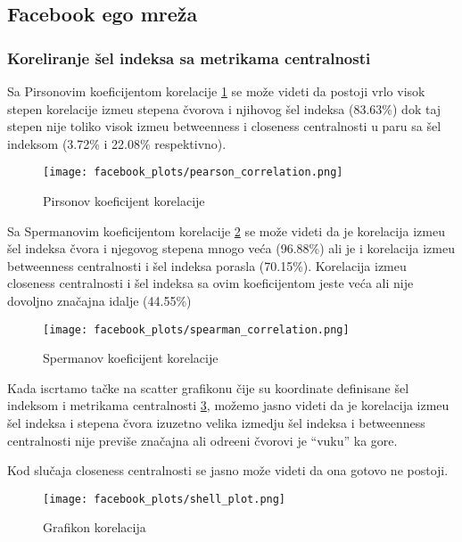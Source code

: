 \documentclass[11pt,a4paper]{article}
\begin{document}
\subsection{Facebook ego mre\v za}

\subsubsection{Koreliranje \v sel indeksa sa metrikama centralnosti}

Sa Pirsonovim koeficijentom korelacije \ref{fig:facebook-prison} se mo\v ze videti da postoji vrlo visok stepen korelacije izme\dj u stepena \v cvorova i njihovog \v sel indeksa (83.63\%) dok taj stepen nije toliko visok izme\dj u betweenness i closeness centralnosti u paru sa \v sel indeksom (3.72\% i 22.08\% respektivno).

\begin{figure}
    \centering
    \texttt{[image: facebook\_plots/pearson\_correlation.png]}
    \caption{Pirsonov koeficijent korelacije}
    \label{fig:facebook-prison}
\end{figure}

Sa Spermanovim koeficijentom korelacije \ref{fig:facebook-sperman} se mo\v ze videti da je korelacija izme\dj u \v sel indeksa \v cvora i njegovog stepena mnogo ve\' ca (96.88\%) ali je i korelacija izme\dj u betweenness centralnosti i \v sel indeksa porasla (70.15\%). Korelacija izme\dj u closeness centralnosti i \v sel indeksa sa ovim koeficijentom jeste ve\' ca ali nije dovoljno zna\v cajna idalje (44.55\%)

\begin{figure}
    \centering
    \texttt{[image: facebook\_plots/spearman\_correlation.png]}
    \caption{Spermanov koeficijent korelacije}
    \label{fig:facebook-sperman}
\end{figure}

Kada iscrtamo ta\v cke na scatter grafikonu \v cije su koordinate definisane \v sel indeksom i metrikama centralnosti \ref{fig:facebook-korelacije}, mo\v zemo jasno videti da je korelacija izme\dj u \v sel indeksa i stepena \v cvora izuzetno velika izmedju \v sel indeksa i betweenness centralnosti nije previ\v se zna\v cajna ali odre\dj eni \v cvorovi je ``vuku'' ka gore.

Kod slu\v caja closeness centralnosti se jasno mo\v ze videti da ona gotovo ne postoji.

\begin{figure}
    \centering
    \texttt{[image: facebook\_plots/shell\_plot.png]}
    \caption{Grafikon korelacija}
    \label{fig:facebook-korelacije}
\end{figure}
\end{document}
